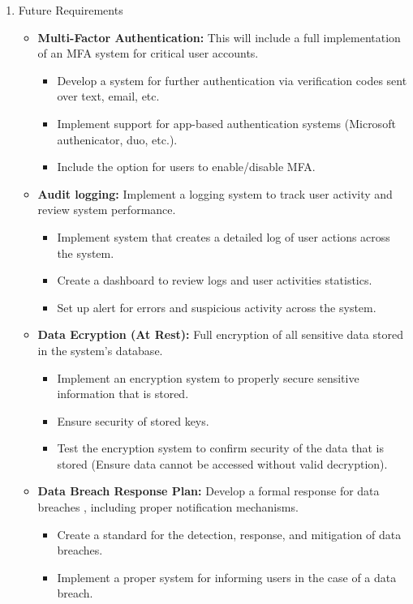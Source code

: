 \documentclass{article}
\begin{document}
\begin{enumerate}
\begin{itemize}
		\end{itemize}
	\item Future Requirements
		\begin{itemize}
			\item \textbf{Multi-Factor Authentication:} This will include a full implementation of an MFA system for critical user accounts.
			\begin{itemize}
				\item Develop a system for further authentication via verification codes sent over text, email, etc.
				\item Implement support for app-based authentication systems (Microsoft authenicator, duo, etc.).
				\item Include the option for users to enable/disable MFA.
			\end{itemize}
			\item \textbf{Audit logging:} Implement a logging system to track user activity and review system performance.
			\begin{itemize}
				\item Implement system that creates a detailed log of user actions across the system.
				\item Create a dashboard to review logs and user activities statistics.
				\item Set up alert for errors and suspicious activity across the system.
			\end{itemize}
			\item \textbf{Data Ecryption (At Rest):} Full encryption of all sensitive data stored in the system's database.
			\begin{itemize}
				\item Implement an encryption system to properly secure sensitive information that is stored.
				\item Ensure security of stored keys.
				\item Test the encryption system to confirm security of the data that is stored (Ensure data cannot be accessed without valid decryption).
			\end{itemize}
			\item \textbf{Data Breach Response Plan:} Develop a formal response for data breaches , including proper notification mechanisms.
			\begin{itemize}
				\item Create a standard for the detection, response, and mitigation of data breaches.
				\item Implement a proper system for informing users in the case of a data breach.

\end{itemize}
\end{itemize}
\end{enumerate}
\end{document}
